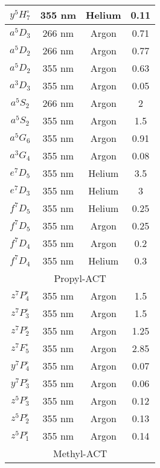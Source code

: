 \documentclass[12pt,twoside]{reedthesis}
\begin{document}
\begin{longtable}{||c|c|c|c||}
	    $y^{5}H^{\circ}_{7}$ & 355 nm & Helium & 0.11 \\\hline
	    $a^{5}D_{3}$ & 266 nm & Argon & 0.71 \\\hline
	    $a^{5}D_{2}$ & 266 nm & Argon & 0.77 \\\hline
	    $a^{5}D_{2}$ & 355 nm & Argon & 0.63 \\\hline
	    $a^{3}D_{3}$ & 355 nm & Argon & 0.05 \\\hline
	    $a^{5}S_{2}$ & 266 nm & Argon & 2 \\\hline
	    $a^{5}S_{2}$ & 355 nm & Argon & 1.5 \\\hline
	    $a^{5}G_{6}$ & 355 nm & Argon & 0.91 \\\hline
	    $a^{3}G_{4}$ & 355 nm & Argon & 0.08 \\\hline
	    $e^{7}D_{5}$ & 355 nm & Helium & 3.5 \\\hline
	    $e^{7}D_{3}$ & 355 nm & Helium & 3 \\\hline
	    $f^{7}D_{5}$ & 355 nm & Helium & 0.25 \\\hline
	    $f^{7}D_{5}$ & 355 nm & Argon & 0.25 \\\hline
	    $f^{7}D_{4}$ & 355 nm & Argon & 0.2 \\\hline
	    $f^{7}D_{4}$ & 355 nm & Helium & 0.3 \\\hline
	    \multicolumn{4}{||c||}{Propyl-ACT} \\\hline
	    $z^{7}P^{\circ}_{4}$ & 355 nm & Argon & 1.5 \\\hline
	    $z^{7}P^{\circ}_{3}$ & 355 nm & Argon & 1.5 \\\hline
	    $z^{7}P^{\circ}_{2}$ & 355 nm & Argon & 1.25 \\\hline
	    $z^{7}F^{\circ}_{5}$ & 355 nm & Argon & 2.85 \\\hline
	    $y^{7}P^{\circ}_{4}$ & 355 nm & Argon & 0.07 \\\hline
	    $y^{7}P^{\circ}_{3}$ & 355 nm & Argon & 0.06 \\\hline
	    $z^{5}P^{\circ}_{3}$ & 355 nm & Argon & 0.12 \\\hline
	    $z^{5}P^{\circ}_{2}$ & 355 nm & Argon & 0.13 \\\hline
	    $z^{5}P^{\circ}_{1}$ & 355 nm & Argon & 0.14 \\\hline
	    \multicolumn{4}{||c||}{Methyl-ACT} \\\hline

\end{longtable}
\end{document}
